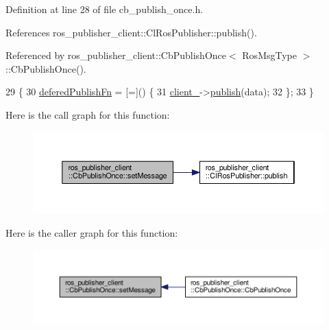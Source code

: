 Definition at line 28 of file cb\+\_\+publish\+\_\+once.\+h.



References ros\+\_\+publisher\+\_\+client\+::\+Cl\+Ros\+Publisher\+::publish().



Referenced by ros\+\_\+publisher\+\_\+client\+::\+Cb\+Publish\+Once$<$ Ros\+Msg\+Type $>$\+::\+Cb\+Publish\+Once().


\begin{DoxyCode}
29     \{
30         \hyperlink{classros__publisher__client_1_1CbPublishOnce_a91e0e3d574d25e160bcb3a4ca81bb0b2}{deferedPublishFn} = [=]() \{
31             \hyperlink{classros__publisher__client_1_1CbPublishOnce_a50a1b2a4892ad780406231e0f870746a}{client\_}->\hyperlink{classros__publisher__client_1_1ClRosPublisher_a9e62a3581a730cd2e287e560d04d151b}{publish}(data);
32         \};
33     \}
\end{DoxyCode}


Here is the call graph for this function\+:\nopagebreak
\begin{figure}[H]
\begin{center}
\leavevmode
\includegraphics[width=350pt]{classros__publisher__client_1_1CbPublishOnce_a06bef500e116390ee85a790401e600d8_cgraph}
\end{center}
\end{figure}




Here is the caller graph for this function\+:\nopagebreak
\begin{figure}[H]
\begin{center}
\leavevmode
\includegraphics[width=350pt]{classros__publisher__client_1_1CbPublishOnce_a06bef500e116390ee85a790401e600d8_icgraph}
\end{center}
\end{figure}




